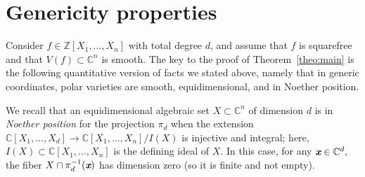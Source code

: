 \documentclass[sigconf]{acmart}
\def\xb{\textit{\textbf{x}}}
\def\C{\mathbb{C}}
\def\jac{ \textbf{jac}}
\def\grad{\textrm{grad}}
\def\reg{\textrm{reg}}
\newcommand{\ZZ}{{\mathbb{Z}}}
\begin{document}



\section{Genericity properties}

Consider $f \in \ZZ[X_1,\hdots,X_n]$ with total degree $d$, and assume
that $f$ is squarefree and that $V(f) \subset \C^n$ is smooth. The key
to the proof of Theorem~\ref{theo:main} is the following quantitative
version of facts we stated above, namely that in generic coordinates,
polar varieties are smooth, equidimensional, and in Noether position.

We recall that an equidimensional algebraic set $X \subset \C^n$ of
dimension $d$ is in \textit{Noether position} for the projection
$\pi_d$ when the extension $\C[X_1,\hdots,X_d] \rightarrow
\C[X_1,\hdots,X_n]/I(X)$ is injective and integral; here, $I(X)
\subset \C[X_1,\dots,X_n]$ is the defining ideal of $X$. In this case,
for any $\xb \in \C^d,$ the fiber $X \cap \pi_d^{-1}(\xb)$ has
dimension zero (so it is finite and not empty).
\end{document}
